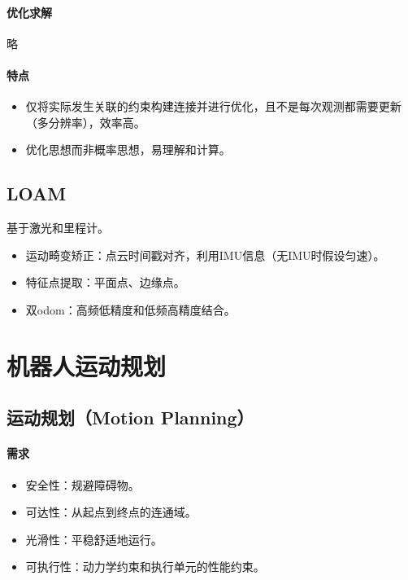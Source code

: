 \documentclass[
12pt, %
a4paper, 
oneside, %
headinclude,footinclude, %
]{scrartcl}
\begin{document}
\paragraph{优化求解}
略
\paragraph{特点}
\begin{itemize}
\item 仅将实际发生关联的约束构建连接并进行优化，且不是每次观测都需要更新（多分辨率），效率高。
\item 优化思想而非概率思想，易理解和计算。
\end{itemize}
\subsection[LOAM]{LOAM}
基于激光和里程计。
\begin{itemize}
\item 运动畸变矫正：点云时间戳对齐，利用IMU信息（无IMU时假设匀速）。
\item 特征点提取：平面点、边缘点。
\item 双odom：高频低精度和低频高精度结合。
\end{itemize}
\section{机器人运动规划}
\subsection[运动规划]{运动规划（Motion Planning）}
\paragraph{需求}
\begin{itemize}
\item 安全性：规避障碍物。
\item 可达性：从起点到终点的连通域。
\item 光滑性：平稳舒适地运行。
\item 可执行性：动力学约束和执行单元的性能约束。
\end{itemize}
\end{document}

